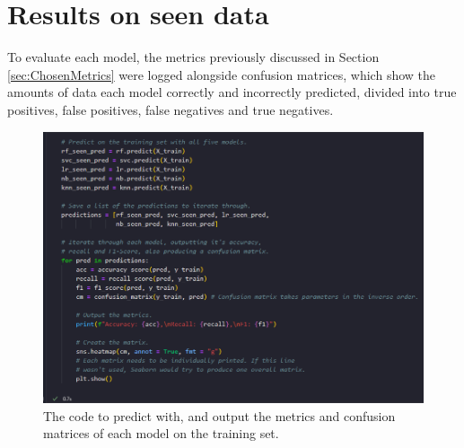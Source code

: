 \documentclass[12pt]{report}
\begin{document}
\pagebreak
\section{Results on seen data}

To evaluate each model, the metrics previously discussed in Section \ref{sec:ChosenMetrics} 
were logged alongside confusion matrices, which show the amounts of data
each model correctly and incorrectly predicted, divided into true positives, false positives, 
false negatives and true negatives.

\begin{figure}[H]
    \centering 
    \includegraphics[width=\linewidth]{ModelDev/Iteration1/Code/Seen/Matrices.png}
    \caption{The code to predict with, and output the metrics and confusion matrices of each model on the training set.}
    \label{fig:SeenDataCode}
\end{figure}
\end{document}
